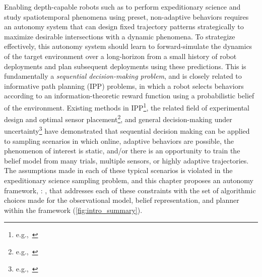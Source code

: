 Enabling depth-capable robots such as \Sentry to perform expeditionary science and study spatiotemporal phenomena using preset, non-adaptive behaviors requires an autonomy system that can design fixed trajectory patterns strategically to maximize desirable intersections with a dynamic phenomena. To strategize effectively, this autonomy system should learn to forward-simulate the dynamics of the target environment over a long-horizon from a small history of robot deployments and plan subsequent deployments using these predictions. This is fundamentally a \emph{sequential decision-making problem}, and is closely related to informative path planning (IPP) problems, in which a robot selects behaviors according to an information-theoretic reward function using a probabilistic belief of the environment. Existing methods in IPP\footnote{e.g.,~\cite{Hitz2017,hollinger2013sampling,flaspohler2019information,levine2010information,binney2012branch}}, the related field of experimental design and optimal sensor placement\footnote{e.g.,~\cite{krause2008near,wang2019reinforcement}}, and general decision-making under uncertainty\footnote{e.g.,~\cite{sunberg2018online, somani2013despot,kocsis2006bandit,Silver2010}} have demonstrated that sequential decision making can be applied to sampling scenarios in which online, adaptive behaviors are possible, the phenomenon of interest is static, and/or there is an opportunity to train the belief model from many trials, multiple sensors, or highly adaptive trajectories. The assumptions made in each of these typical scenarios is violated in the expeditionary science sampling problem, and this chapter proposes an autonomy framework, \PHORTEX: \phortex, that addresses each of these constraints with the set of algorithmic choices made for the observational model, belief representation, and planner within the framework (\cref{fig:intro_summary}). 


